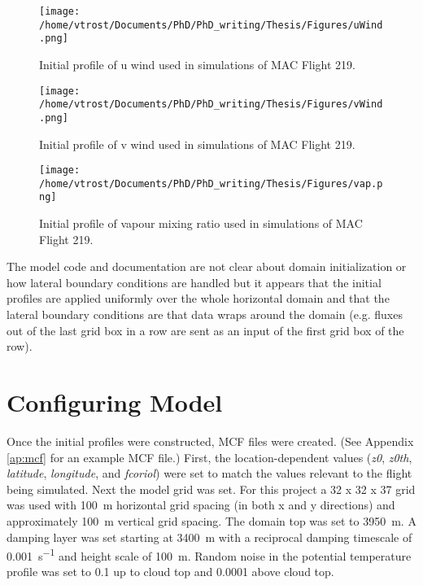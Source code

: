 
\begin{figure}[H]
	\centering
	\texttt{[image: /home/vtrost/Documents/PhD/PhD\_writing/Thesis/Figures/uWind.png]}
	\caption{Initial profile of u wind used in simulations of MAC Flight 219.}
	\label{fig:initU}
\end{figure}

\begin{figure}[H]
	\centering
	\texttt{[image: /home/vtrost/Documents/PhD/PhD\_writing/Thesis/Figures/vWind.png]}
	\caption{Initial profile of v wind used in simulations of MAC Flight 219.}
	\label{fig:initV}
\end{figure}

\begin{figure}[H]
	\centering
	\texttt{[image: /home/vtrost/Documents/PhD/PhD\_writing/Thesis/Figures/vap.png]}
	\caption{Initial profile of vapour mixing ratio used in simulations of MAC Flight 219.}
	\label{fig:initVap}
\end{figure}

The model code and documentation are not clear about domain initialization or how lateral boundary conditions are handled but it appears that the initial profiles are applied uniformly over the whole horizontal domain and that the lateral boundary conditions are that data wraps around the domain (e.g. fluxes out of the last grid box in a row are sent as an input of the first grid box of the row). 

\section{Configuring Model}
Once the initial profiles were constructed, MCF files were created. (See Appendix \ref{ap:mcf} for an example MCF file.) First, the location-dependent values (\textit{z0}, \textit{z0th}, \textit{latitude}, \textit{longitude}, and \textit{fcoriol}) were set to match the values relevant to the flight being simulated. Next the model grid was set. For this project a 32 x 32 x 37 grid was used with \SI{100}{m} horizontal grid spacing (in both x and y directions) and approximately \SI{100}{m} vertical grid spacing. The domain top was set to \SI{3950}{m}. A damping layer was set starting at \SI{3400}{m} with a reciprocal damping timescale of \SI{0.001}{s^{-1}} and height scale of \SI{100}{m}. Random noise in the potential temperature profile was set to 0.1 up to cloud top and 0.0001 above cloud top.

